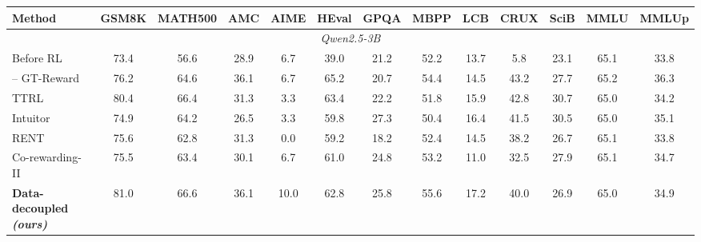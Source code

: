 \begin{table}[t]\centering\footnotesize
\setlength{\tabcolsep}{4.2pt}\renewcommand{\arraystretch}{1.12}
\begin{tabular}{lcccccccccccc}
\toprule
Method & GSM8K & MATH500 & AMC & AIME & HEval & GPQA & MBPP & LCB & CRUX & SciB & MMLU & MMLUp \\
\midrule
\multicolumn{13}{c}{\textit{Qwen2.5-3B}}\\
\midrule
Before RL & 73.4 & 56.6 & 28.9 & 6.7 & 39.0 & 21.2 & 52.2 & 13.7 & 5.8 & 23.1 & 65.1 & 33.8 \\
\hspace{1em}-- GT-Reward & 76.2 & 64.6 & 36.1 & 6.7 & 65.2 & 20.7 & 54.4 & 14.5 & 43.2 & 27.7 & 65.2 & 36.3 \\
\cmidrule(lr){1-13}
TTRL & \cellcolor{heat!53}80.4 & \cellcolor{heat!53}66.4 & \cellcolor{heat!29}31.3 & \cellcolor{heat!19}3.3 & \cellcolor{heat!39}63.4 & \cellcolor{heat!29}22.2 & \cellcolor{heat!17}51.8 & \cellcolor{heat!47}15.9 & \cellcolor{heat!49}42.8 & \cellcolor{heat!58}30.7 & \cellcolor{heat!12}65.0 & \cellcolor{heat!12}34.2 \\
Intuitor & \cellcolor{heat!6}74.9 & \cellcolor{heat!24}64.2 & \cellcolor{heat!6}26.5 & \cellcolor{heat!19}3.3 & \cellcolor{heat!11}59.8 & \cellcolor{heat!58}27.3 & \cellcolor{heat!6}50.4 & \cellcolor{heat!51}16.4 & \cellcolor{heat!44}41.5 & \cellcolor{heat!55}30.5 & \cellcolor{heat!6}65.0 & \cellcolor{heat!26}35.1 \\
RENT & \cellcolor{heat!12}75.6 & \cellcolor{heat!6}62.8 & \cellcolor{heat!29}31.3 & \cellcolor{heat!6}0.0 & \cellcolor{heat!6}59.2 & \cellcolor{heat!6}18.2 & \cellcolor{heat!22}52.4 & \cellcolor{heat!35}14.5 & \cellcolor{heat!30}38.2 & \cellcolor{heat!6}26.7 & \cellcolor{heat!21}65.1 & \cellcolor{heat!6}33.8 \\
Co-rewarding-II & \cellcolor{heat!11}75.5 & \cellcolor{heat!14}63.4 & \cellcolor{heat!23}30.1 & \cellcolor{heat!32}6.7 & \cellcolor{heat!20}61.0 & \cellcolor{heat!44}24.8 & \cellcolor{heat!29}53.2 & \cellcolor{heat!6}11.0 & \cellcolor{heat!6}32.5 & \cellcolor{heat!22}27.9 & \cellcolor{heat!35}65.1 & \cellcolor{heat!20}34.7 \\
\textbf{Data-decoupled \emph{(ours)}} & \cellcolor{heat!58}81.0 & \cellcolor{heat!55}66.6 & \cellcolor{heat!52}36.1 & \cellcolor{heat!45}10.0 & \cellcolor{heat!34}62.8 & \cellcolor{heat!49}25.8 & \cellcolor{heat!48}55.6 & \cellcolor{heat!58}17.2 & \cellcolor{heat!38}40.0 & \cellcolor{heat!9}26.9 & \cellcolor{heat!14}65.0 & \cellcolor{heat!23}34.9 \\

\end{tabular}
\end{table}
